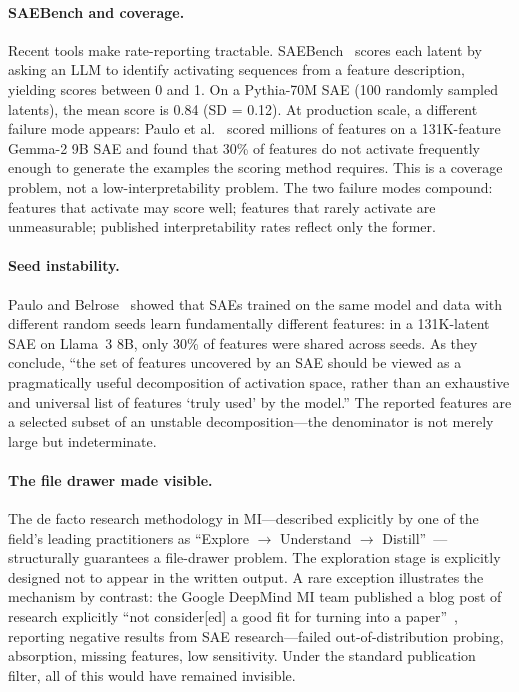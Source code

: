 \documentclass{article}
\begin{document}
\paragraph{SAEBench and coverage.} Recent tools make rate-reporting tractable. SAEBench~\citep{karvonen_saebench_2025} scores each latent by asking an LLM to identify activating sequences from a feature description, yielding scores between 0 and 1. On a Pythia-70M SAE (100 randomly sampled latents), the mean score is 0.84 (SD = 0.12). At production scale, a different failure mode appears: Paulo et al.~\citep{paulo_autointerp_2024} scored millions of features on a 131K-feature Gemma-2 9B SAE and found that 30\% of features do not activate frequently enough to generate the examples the scoring method requires. This is a coverage problem, not a low-interpretability problem. The two failure modes compound: features that activate may score well; features that rarely activate are unmeasurable; published interpretability rates reflect only the former.

\paragraph{Seed instability.} Paulo and Belrose~\citep{paulo_belrose_seeds_2026} showed that SAEs trained on the same model and data with different random seeds learn fundamentally different features: in a 131K-latent SAE on Llama~3 8B, only 30\% of features were shared across seeds. As they conclude, ``the set of features uncovered by an SAE should be viewed as a pragmatically useful decomposition of activation space, rather than an exhaustive and universal list of features `truly used' by the model.'' The reported features are a selected subset of an unstable decomposition---the denominator is not merely large but indeterminate.

\paragraph{The file drawer made visible.} The de facto research methodology in MI---described explicitly by one of the field's leading practitioners as ``Explore $\to$ Understand $\to$ Distill''~\citep{nanda_research_process_2023}---structurally guarantees a file-drawer problem. The exploration stage is explicitly designed not to appear in the written output. A rare exception illustrates the mechanism by contrast: the Google DeepMind MI team published a blog post of research explicitly ``not consider[ed] a good fit for turning into a paper''~\citep{smith_gdm_negative_2025}, reporting negative results from SAE research---failed out-of-distribution probing, absorption, missing features, low sensitivity. Under the standard publication filter, all of this would have remained invisible.
\end{document}
